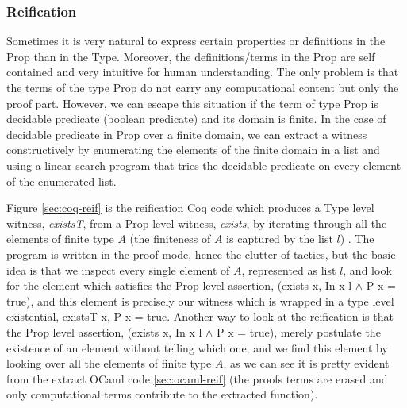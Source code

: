  
  
  \subsubsection{Reification}
  \label{sec:reification}
  Sometimes it is very natural to express certain properties or definitions
  in the Prop than in the Type.  Moreover, the definitions/terms in the Prop are self contained and 
  very intuitive for human understanding. The only problem is that the terms of the type Prop do not carry any 
  computational content but only the proof part.  However, 
  we can escape this situation if the term of type Prop is decidable predicate (boolean predicate) and its domain is finite. 
  In the case of decidable predicate in Prop over a finite domain,  we can extract 
  a witness constructively by enumerating the elements of the finite domain in a 
  list and using a linear search program that tries the decidable predicate on
  every element of the enumerated list. 
  
  
  Figure \ref{sec:coq-reif} is the
  reification Coq code 
  which produces a Type level witness, \textit{existsT},
  from a Prop level witness, \textit{exists}, by iterating 
  through all the elements of finite type $A$ (the finiteness 
  of $A$ is captured by the list $l$) \citep{10.1145/2808098.2808102}. The program is written 
  in the proof mode, hence the clutter of tactics, but the basic idea is that 
  we inspect every single element of  $A$, represented as list $l$, 
  and look for the element which satisfies the Prop level assertion, 
  (exists x, In x l  $\wedge$  P x = true), and this element is 
  precisely our witness which is wrapped in a type level existential,  
  existsT x, P x = true.  Another way to look at the  reification is that 
  the Prop level assertion, (exists x, In x l  $\wedge$  P x = true), 
  merely  postulate the existence of an element without telling which one, 
  and we find this element by looking over all the elements of finite type $A$, 
  as we can see it is pretty evident from the extract OCaml code \ref{sec:ocaml-reif}
  (the proofs terms are erased and only computational terms contribute to the 
   extracted function). 

